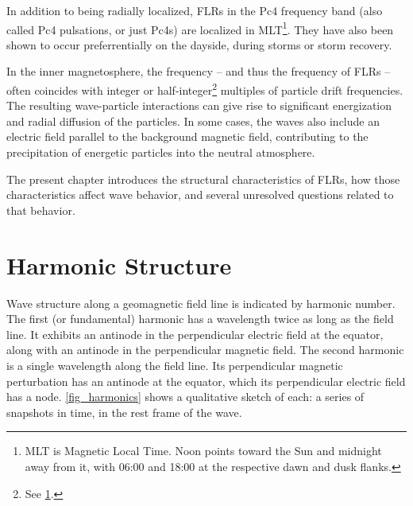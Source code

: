 In addition to being radially localized, FLRs in the Pc4 frequency band (also called Pc4 pulsations, or just Pc4s) are localized in MLT\footnote{MLT is Magnetic Local Time. Noon points toward the Sun and midnight away from it, with 06:00 and 18:00 at the respective dawn and dusk flanks. }. They have also been shown to occur preferrentially on the dayside, during storms or storm recovery\cite{anderson_1990,dai_2015,engebretson_1992,kokubun_1989,liu_2009,ukhorskiy_2005}. 

In the inner magnetosphere, the \Alfven frequency -- and thus the frequency of FLRs -- often coincides with integer or half-integer\footnote{See \cref{sec_harmonics}. } multiples of particle drift frequencies\cite{dai_2013}. The resulting wave-particle interactions can give rise to significant energization and radial diffusion of the particles. In some cases, the waves also include an electric field parallel to the background magnetic field, contributing to the precipitation of energetic particles into the neutral atmosphere\cite{goertz_1979,goertz_1984,thompson_1996,wygant_2002}. 

The present chapter introduces the structural characteristics of FLRs, how those characteristics affect wave behavior, and several unresolved questions related to that behavior. 

\section{Harmonic Structure}
  \label{sec_harmonics}

Wave structure along a geomagnetic field line is indicated by harmonic number. The first (or fundamental) harmonic has a wavelength twice as long as the field line. It exhibits an antinode in the perpendicular electric field at the equator, along with an antinode in the perpendicular magnetic field. The second harmonic is a single wavelength along the field line. Its perpendicular magnetic perturbation has an antinode at the equator, which its perpendicular electric field has a node. \cref{fig_harmonics} shows a qualitative sketch of each: a series of snapshots in time, in the rest frame of the wave. 


